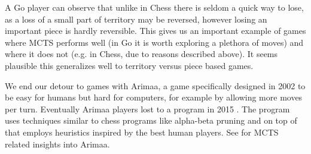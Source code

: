A Go player can observe that unlike in Chess there is seldom a quick way
to lose, as a loss of a small part of territory may be reversed, however
losing an important piece is hardly reversible.
This gives us an important example of games where MCTS performs well (in
Go it is worth exploring a plethora of moves) and where it does not
(e.g. in Chess, due to reasons described above).
It seems plausible this
generalizes well to territory versus piece based games.

We end our detour to games with Arimaa, a game specifically designed in
2002 to be easy for humans but hard for computers, for example by
allowing more moves per turn. Eventually Arimaa players lost to a
program in 2015 \parencite{arimaa}. The program uses techniques similar
to chess programs like alpha-beta pruning and on top of that employs
heuristics inspired by the best human players. See \parencite{jakl} for
MCTS related insights into Arimaa.
